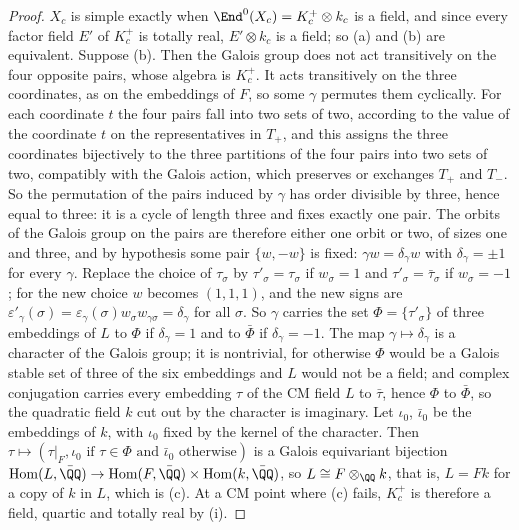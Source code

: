 \begin{proof}
$X_{c}$ is simple exactly when $\End^{0}(X_{c})=K_{c}^{+}\otimes k_{c}$ is a
field, and since every factor field $E'$ of $K_{c}^{+}$ is totally real,
$E'\otimes k_{c}$ is a field; so (a) and (b) are equivalent. Suppose (b).
Then the Galois group does not act transitively on the four opposite pairs,
whose algebra is $K_{c}^{+}$. It acts transitively on the three
coordinates, as on the embeddings of $F$, so some $\gamma$ permutes them
cyclically. For each coordinate $t$ the four pairs fall into two sets of
two, according to the value of the coordinate $t$ on the representatives in
$T_{+}$, and this assigns the three coordinates bijectively to the three
partitions of the four pairs into two sets of two, compatibly with the
Galois action, which preserves or exchanges $T_{+}$ and $T_{-}$. So the
permutation of the pairs induced by $\gamma$ has order divisible by three,
hence equal to three: it is a cycle of length three and fixes exactly one
pair. The orbits of the Galois group on the pairs are therefore either one
orbit or two, of sizes one and three, and by hypothesis some pair
$\{w,-w\}$ is fixed: $\gamma w=\delta_{\gamma}w$ with
$\delta_{\gamma}=\pm1$ for every $\gamma$. Replace the choice of
$\tau_{\sigma}$ by $\tau'_{\sigma}=\tau_{\sigma}$ if $w_{\sigma}=1$ and
$\tau'_{\sigma}=\bar{\tau}_{\sigma}$ if $w_{\sigma}=-1$; for the new choice
$w$ becomes $(1,1,1)$, and the new signs are
$\varepsilon'_{\gamma}(\sigma)=\varepsilon_{\gamma}(\sigma)w_{\sigma}
w_{\gamma\sigma}=\delta_{\gamma}$ for all $\sigma$. So $\gamma$ carries the
set $\Phi=\{\tau'_{\sigma}\}$ of three embeddings of $L$ to $\Phi$ if
$\delta_{\gamma}=1$ and to $\bar{\Phi}$ if $\delta_{\gamma}=-1$. The map
$\gamma\mapsto\delta_{\gamma}$ is a character of the Galois group; it is
nontrivial, for otherwise $\Phi$ would be a Galois stable set of three of the
six embeddings and $L$ would not be a field; and complex conjugation carries
every embedding $\tau$ of the CM field $L$ to $\bar{\tau}$, hence $\Phi$ to
$\bar{\Phi}$, so the quadratic field $k$ cut out by the character is
imaginary. Let $\iota_{0}$, $\bar{\iota}_{0}$ be the embeddings of $k$, with
$\iota_{0}$ fixed by the kernel of the character. Then $\tau\mapsto(\tau|_{F},
\iota_{0}\text{ if }\tau\in\Phi\text{ and }\bar{\iota}_{0}\text{ otherwise})$
is a Galois equivariant bijection $\operatorname{Hom}(L,\bar{\QQ})\to
\operatorname{Hom}(F,\bar{\QQ})\times\operatorname{Hom}(k,\bar{\QQ})$, so
$L\cong F\otimes_{\QQ}k$, that is, $L=Fk$ for a copy of $k$ in $L$, which is
(c). At a CM point where (c) fails, $K_{c}^{+}$ is therefore a field, quartic
and totally real by (i).


\end{proof}
